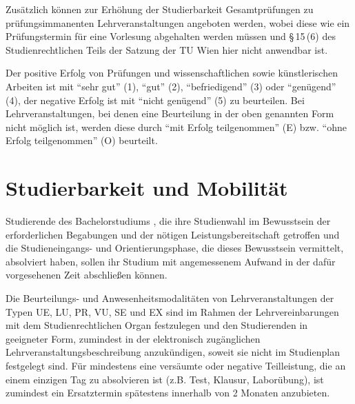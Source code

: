 Zusätzlich können zur Erhöhung der Studierbarkeit Gesamtprüfungen zu
prüfungsimmanenten Lehrveranstaltungen angeboten werden, wobei diese
wie ein Prüfungstermin für eine Vorlesung abgehalten werden müssen und
§\,15\,(6) des Studienrechtlichen Teils der Satzung der TU Wien hier
nicht anwendbar ist.

Der positive Erfolg von Prüfungen und wissenschaftlichen sowie
künstlerischen Arbeiten ist mit "`sehr gut"' (1), "`gut"'
(2), "`befriedigend"' (3) oder "`genügend"' (4), der negative Erfolg
ist mit "`nicht genügend"' (5) zu beurteilen. Bei Lehrveranstaltungen,
bei denen eine Beurteilung in der oben genannten Form nicht möglich ist,
werden diese durch "`mit Erfolg teilgenommen"' (E) bzw.
"`ohne Erfolg teilgenommen"' (O) beurteilt.

%

\section{Studierbarkeit und Mobilität}\label{sec:SM}

Studierende des Bachelorstudiums \emph{}, die ihre
Studienwahl im Bewusstsein der erforderlichen Begabungen und der
nötigen Leistungsbereitschaft getroffen und die Studieneingangs- und
Orientierungsphase, die dieses Bewusstsein vermittelt, absolviert
haben, sollen ihr Studium mit angemessenem Aufwand in der dafür
vorgesehenen Zeit abschließen können.

%

Die Beurteilungs- und Anwesenheitsmodalitäten von Lehrveranstaltungen
der Typen UE, LU, PR, VU, SE und EX sind im Rahmen der
Lehrvereinbarungen mit dem Studienrechtlichen Organ festzulegen und
den Studierenden in geeigneter Form, zumindest in der elektronisch
zugänglichen Lehrveranstaltungsbeschreibung anzukündigen, soweit sie
nicht im Studienplan festgelegt sind. Für mindestens eine versäumte
oder negative Teilleistung, die an einem einzigen Tag zu absolvieren
ist (z.B. Test, Klausur, Laborübung), ist zumindest ein Ersatztermin
spätestens innerhalb von 2 Monaten anzubieten.

